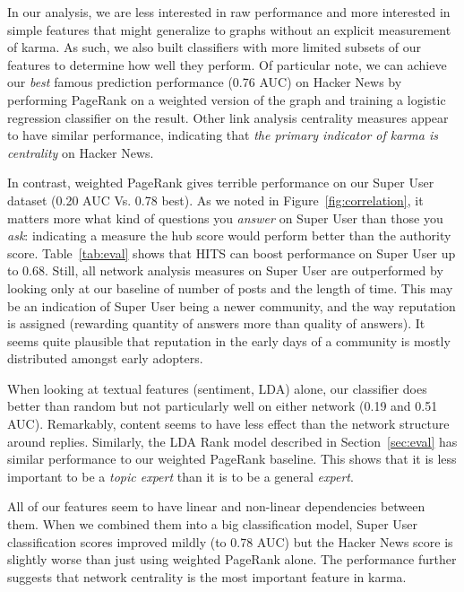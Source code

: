 \documentclass[11pt]{article}
\begin{document}
In our analysis, we are less interested in raw performance and more interested in 
simple features that might generalize
to graphs without an explicit measurement of karma. As such, we also built classifiers
with more limited subsets of our features to determine how well they perform. Of particular note,
we can achieve our \textit{best} famous prediction performance (0.76 AUC) 
on Hacker News by performing PageRank on a weighted version of the graph and training
a logistic regression classifier on the result. Other link analysis centrality measures 
appear to have similar performance, indicating that \textit{the primary indicator of karma 
is centrality} on Hacker News.

In contrast, weighted PageRank gives terrible performance on our Super User dataset
(0.20 AUC Vs. 0.78 best). As we noted in Figure~\ref{fig:correlation}, it matters
more what kind of questions you \textit{answer} on Super User than those you 
\textit{ask}: indicating a measure the hub score would perform better than
the authority score. Table~\ref{tab:eval} shows that HITS can boost performance
on Super User up to 0.68. Still, all network analysis measures on Super User 
are outperformed by looking only at our baseline of number of posts and the length
of time. This may be an indication of Super User being a newer community, and the
way reputation is assigned (rewarding quantity of answers more than quality of answers).
It seems quite plausible that reputation in the early days of a community is mostly
distributed amongst early adopters.

When looking at textual features (sentiment, LDA) alone, our classifier does better than random 
but not particularly well on either network (0.19 and 0.51 AUC). Remarkably, content
seems to have less effect than the network structure around replies. Similarly, the LDA Rank model 
described in Section~\ref{sec:eval} has similar performance to our weighted PageRank baseline. 
This shows that it is less important to be a \textit{topic expert} than it is to be a general
\textit{expert}.

All of our features seem to have linear and non-linear dependencies between them. When we combined
them into a big classification model, Super User classification scores improved mildly (to 0.78 AUC)
but the Hacker News score is slightly worse than just using weighted PageRank alone. The performance
further suggests that network centrality is the most important feature in karma.
\end{document}
